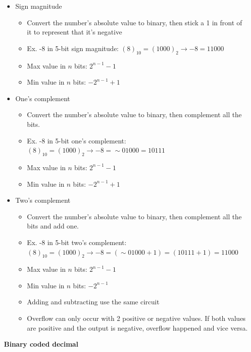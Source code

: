 \documentclass{article}
\begin{document}
\begin{itemize}
    \item Sign magnitude
    \begin{itemize}
        \item Convert the number's absolute value to binary, then stick a 1 in front of it to represent that it's negative
        \item Ex. -8 in 5-bit sign magnitude: $(8)_{10} = (1000)_2 \rightarrow -8 = 11000$
        \item Max value in $n$ bits: $2^{n - 1} - 1$
        \item Min value in $n$ bits: $-2^{n - 1} + 1$
    \end{itemize}
    \item One's complement
    \begin{itemize}
        \item Convert the number's absolute value to binary, then complement all the bits.
        \item Ex. -8 in 5-bit one's complement: $(8)_{10} = (1000)_2 \rightarrow -8 =   \sim 01000 = 10111$
        \item Max value in $n$ bits: $2^{n - 1} - 1$
        \item Min value in $n$ bits: $-2^{n - 1} + 1$
    \end{itemize}
    \item Two's complement
    \begin{itemize}
        \item Convert the number's absolute value to binary, then complement all the bits and add one.
        \item Ex. -8 in 5-bit two's complement: $(8)_{10} = (1000)_2 \rightarrow -8 = (\sim 01000 + 1) = (10111 + 1) = 11000$
        \item Max value in $n$ bits: $2^{n - 1} - 1$
        \item Min value in $n$ bits: $-2^{n - 1}$
        \item Adding and subtracting use the same circuit
        \item Overflow can only occur with 2 positive or negative values. If both values are positive and the output is negative, overflow happened and vice versa.
    \end{itemize}
\end{itemize}
\textbf{Binary coded decimal}
\end{document}
